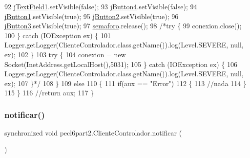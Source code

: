 \begin{DoxyCode}
92                 \mbox{\hyperlink{classpecl6part2_1_1_cliente_controlador_a04f4a0311eac4cee8bca8c1617f2f249}{jTextField1}}.setVisible(\textcolor{keyword}{false});
93                 \mbox{\hyperlink{classpecl6part2_1_1_cliente_controlador_a4d53fe3682184dc12af7fb5edaa74f3a}{jButton4}}.setVisible(\textcolor{keyword}{false});
94                 \mbox{\hyperlink{classpecl6part2_1_1_cliente_controlador_a5571779a9b4a52006f160ba893b7c62d}{jButton1}}.setVisible(\textcolor{keyword}{true});
95                 \mbox{\hyperlink{classpecl6part2_1_1_cliente_controlador_a0de10db6dfe46c00048ea574708f4898}{jButton2}}.setVisible(\textcolor{keyword}{true});
96                 \mbox{\hyperlink{classpecl6part2_1_1_cliente_controlador_a6ed6a9f1bcab81559b649c08fd2a59b8}{jButton3}}.setVisible(\textcolor{keyword}{true});
97                 \mbox{\hyperlink{classpecl6part2_1_1_cliente_controlador_a200ce4defcaa86a68e9c8234f9e48a81}{semaforo}}.release();
98                 \textcolor{comment}{/*try \{}
99 \textcolor{comment}{                    conexion.close();}
100 \textcolor{comment}{                \} catch (IOException ex) \{}
101 \textcolor{comment}{                    Logger.getLogger(ClienteControlador.class.getName()).log(Level.SEVERE, null, ex);}
102 \textcolor{comment}{                \}}
103 \textcolor{comment}{                try \{}
104 \textcolor{comment}{                    conexion = new Socket(InetAddress.getLocalHost(),5031);}
105 \textcolor{comment}{                \} catch (IOException ex) \{}
106 \textcolor{comment}{                    Logger.getLogger(ClienteControlador.class.getName()).log(Level.SEVERE, null, ex);}
107 \textcolor{comment}{                \}*/}
108             \}
109             \textcolor{keywordflow}{else}
110             \{
111                 \textcolor{keywordflow}{if}(aux == \textcolor{stringliteral}{"Error"})
112                 \{
113                     \textcolor{comment}{//nada}
114                 \}
115             \}
116             \textcolor{comment}{//return aux;}
117         \}
\end{DoxyCode}
\mbox{\label{classpecl6part2_1_1_cliente_controlador_a34f39a3db52b361b1fa0ec5213cd8e24}} 
\subsubsection{\texorpdfstring{notificar()}{notificar()}}
{\footnotesize\ttfamily synchronized void pecl6part2.\+Cliente\+Controlador.\+notificar (\begin{DoxyParamCaption}{ }\end{DoxyParamCaption})\hspace{0.3cm}{\ttfamily [inline]}}


